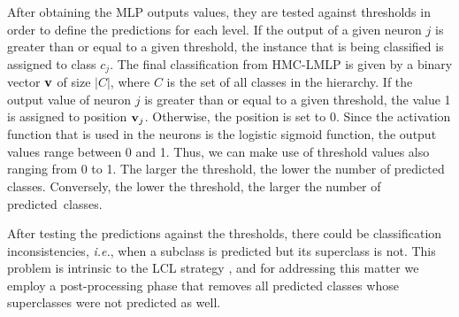 

After obtaining the MLP outputs values, they are tested against thresholds in order to define the predictions for each level. If the output of a given neuron $j$ is greater than or equal to a given threshold, the instance that is being classified is assigned to class $c_j$. The final classification from HMC-LMLP is given by a binary vector ${\bf{v}}$ of size $|C|$, where $C$ is the set of all classes in the hierarchy. If the output value of neuron $j$ is greater than or equal to a given threshold, the value 1 is assigned to position ${\bf v}_j$. Otherwise, the position is set to 0. Since the activation function that is used in the neurons is the logistic sigmoid function, the output values range between 0 and 1. Thus, we can make use of threshold values also ranging from 0 to 1. The larger the threshold, the lower the number of predicted classes. Conversely, the lower the threshold, the larger the number of predicted~classes.

After testing the predictions against the thresholds, there could be classification inconsistencies, \emph{i.e.}, when a subclass is predicted but its superclass is not. This problem is intrinsic to the LCL strategy \cite{Silla2010}, and for addressing this matter we employ a post-processing phase that removes all predicted classes whose superclasses were not predicted as well. 

